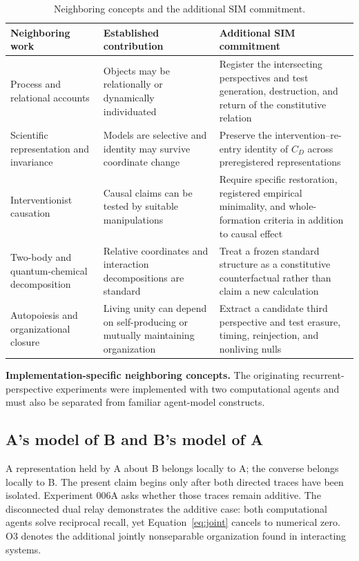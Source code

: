 \documentclass[11pt,a4paper]{article}
\begin{document}
\begin{table}[H]
\centering
\scriptsize
\caption{Neighboring concepts and the additional SIM commitment.}
\label{tab:prior-boundary}
\begin{tabularx}{\textwidth}{@{}>{\raggedright\arraybackslash}p{3.0cm}>{\raggedright\arraybackslash}p{4.4cm}>{\raggedright\arraybackslash}X@{}}
\toprule
Neighboring work & Established contribution & Additional SIM commitment \\
\midrule
Process and relational accounts & Objects may be relationally or dynamically individuated & Register the intersecting perspectives and test generation, destruction, and return of the constitutive relation \\
Scientific representation and invariance & Models are selective and identity may survive coordinate change & Preserve the intervention--re-entry identity of $C_D$ across preregistered representations \\
Interventionist causation & Causal claims can be tested by suitable manipulations & Require specific restoration, registered empirical minimality, and whole-formation criteria in addition to causal effect \\
Two-body and quantum-chemical decomposition & Relative coordinates and interaction decompositions are standard & Treat a frozen standard structure as a constitutive counterfactual rather than claim a new calculation \\
Autopoiesis and organizational closure & Living unity can depend on self-producing or mutually maintaining organization & Extract a candidate third perspective and test erasure, timing, reinjection, and nonliving nulls \\
\bottomrule
\end{tabularx}
\end{table}

\noindent\textbf{Implementation-specific neighboring concepts.}
The originating recurrent-perspective experiments were implemented with two computational agents and must also be separated from familiar agent-model constructs.

\subsection{A's model of B and B's model of A}

A representation held by A about B belongs locally to A; the converse belongs locally to B. The present claim begins only after both directed traces have been isolated. Experiment 006A asks whether those traces remain additive. The disconnected dual relay demonstrates the additive case: both computational agents solve reciprocal recall, yet Equation~\eqref{eq:joint} cancels to numerical zero. O3 denotes the additional jointly nonseparable organization found in interacting systems.
\end{document}
